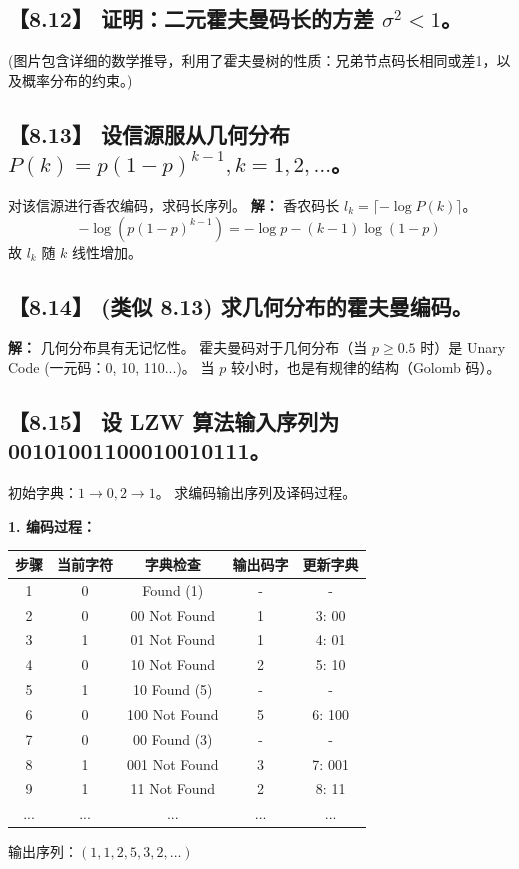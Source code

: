 \documentclass[11pt, a4paper]{article}
\begin{document}
\subsection*{【8.12】 证明：二元霍夫曼码长的方差 $\sigma^2 < 1$。}
(图片包含详细的数学推导，利用了霍夫曼树的性质：兄弟节点码长相同或差1，以及概率分布的约束。)

\subsection*{【8.13】 设信源服从几何分布 $P(k) = p(1-p)^{k-1}, k=1, 2, \dots$。}
对该信源进行香农编码，求码长序列。
\textbf{解：}
香农码长 $l_k = \lceil -\log P(k) \rceil$。
\[ -\log (p(1-p)^{k-1}) = -\log p - (k-1)\log(1-p) \]
故 $l_k$ 随 $k$ 线性增加。

\subsection*{【8.14】 (类似 8.13) 求几何分布的霍夫曼编码。}
\textbf{解：}
几何分布具有无记忆性。
霍夫曼码对于几何分布（当 $p \ge 0.5$ 时）是 Unary Code (一元码：0, 10, 110...)。
当 $p$ 较小时，也是有规律的结构（Golomb 码）。

\subsection*{【8.15】 设 LZW 算法输入序列为 00101001100010010111。}
初始字典：$1 \to 0, 2 \to 1$。
求编码输出序列及译码过程。

\textbf{1. 编码过程：}
\begin{table}[h]
\centering
\small
\begin{tabular}{c|c|c|c|c}
\toprule
步骤 & 当前字符 & 字典检查 & 输出码字 & 更新字典 \\
\midrule
1 & 0 & Found (1) & - & - \\
2 & 0 & 00 Not Found & 1 & 3: 00 \\
3 & 1 & 01 Not Found & 1 & 4: 01 \\
4 & 0 & 10 Not Found & 2 & 5: 10 \\
5 & 1 & 10 Found (5) & - & - \\
6 & 0 & 100 Not Found & 5 & 6: 100 \\
7 & 0 & 00 Found (3) & - & - \\
8 & 1 & 001 Not Found & 3 & 7: 001 \\
9 & 1 & 11 Not Found & 2 & 8: 11 \\
... & ... & ... & ... & ... \\
\bottomrule
\end{tabular}
\end{table}
输出序列：$(1, 1, 2, 5, 3, 2, \dots)$
\end{document}
